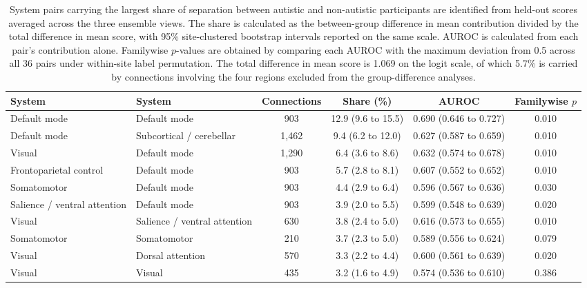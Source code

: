 \begin{table}[t]
\centering
\caption{System pairs carrying the largest share of separation between autistic and non-autistic participants are identified from held-out scores averaged across the three ensemble views. The share is calculated as the between-group difference in mean contribution divided by the total difference in mean score, with 95\% site-clustered bootstrap intervals reported on the same scale. AUROC is calculated from each pair's contribution alone. Familywise $p$-values are obtained by comparing each AUROC with the maximum deviation from 0.5 across all 36 pairs under within-site label permutation. The total difference in mean score is 1.069 on the logit scale, of which 5.7\% is carried by connections involving the four regions excluded from the group-difference analyses.}
\label{tab:system-contributions}
\footnotesize
\setlength{\tabcolsep}{3pt}
\begin{tabular}{@{}llcccc@{}}
\toprule
System & System & Connections & Share (\%) & AUROC & Familywise $p$ \\
\midrule
Default mode & Default mode & 903 & 12.9 (9.6 to 15.5) & 0.690 (0.646 to 0.727) & 0.010 \\
Default mode & Subcortical / cerebellar & 1{,}462 & 9.4 (6.2 to 12.0) & 0.627 (0.587 to 0.659) & 0.010 \\
Visual & Default mode & 1{,}290 & 6.4 (3.6 to 8.6) & 0.632 (0.574 to 0.678) & 0.010 \\
Frontoparietal control & Default mode & 903 & 5.7 (2.8 to 8.1) & 0.607 (0.552 to 0.652) & 0.010 \\
Somatomotor & Default mode & 903 & 4.4 (2.9 to 6.4) & 0.596 (0.567 to 0.636) & 0.030 \\
Salience / ventral attention & Default mode & 903 & 3.9 (2.0 to 5.5) & 0.599 (0.548 to 0.639) & 0.020 \\
Visual & Salience / ventral attention & 630 & 3.8 (2.4 to 5.0) & 0.616 (0.573 to 0.655) & 0.010 \\
Somatomotor & Somatomotor & 210 & 3.7 (2.3 to 5.0) & 0.589 (0.556 to 0.624) & 0.079 \\
Visual & Dorsal attention & 570 & 3.3 (2.2 to 4.4) & 0.600 (0.561 to 0.639) & 0.020 \\
Visual & Visual & 435 & 3.2 (1.6 to 4.9) & 0.574 (0.536 to 0.610) & 0.386 \\
\bottomrule
\end{tabular}
\end{table}


